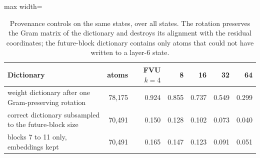 \begin{table}[H]\centering\small
\caption{Provenance controls on the same states, over all states. The rotation preserves the Gram matrix of the dictionary and destroys its alignment with the residual coordinates; the future-block dictionary contains only atoms that could not have written to a layer-6 state.}\label{app:prov}
\begin{adjustbox}{max width=\linewidth}
\begin{tabular}{lrrrrrr}\toprule
Dictionary & atoms & FVU $k{=}4$ & 8 & 16 & 32 & 64 \\ \midrule
weight dictionary after one Gram-preserving rotation & 78,175 & 0.924 & 0.855 & 0.737 & 0.549 & 0.299 \\
correct dictionary subsampled to the future-block size & 70,491 & 0.150 & 0.128 & 0.102 & 0.073 & 0.040 \\
blocks 7 to 11 only, embeddings kept & 70,491 & 0.165 & 0.147 & 0.123 & 0.091 & 0.051 \\
\bottomrule\end{tabular}\end{adjustbox}
\end{table}
